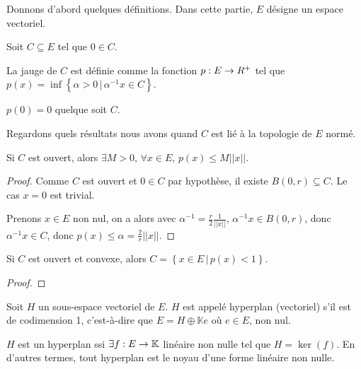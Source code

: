 Donnons d'abord quelques définitions. Dans cette partie, $E$ désigne un espace
vectoriel.

\begin{definition} [Jauge]
	Soit $C \subseteq E$ tel que $0 \in C$.

	La jauge de $C$ est définie comme la fonction $p : E \rightarrow R^{+}$
	tel que $p(x) = \inf\left\{ \alpha > 0 \, | \, \alpha^{-1}x \in C\right\}$.
\end{definition}

\begin{exercice}
	$p(0) = 0$ quelque soit $C$.
\end{exercice}

Regardons quels résultats nous avons quand $C$ est lié à la topologie de $E$
normé.

\begin{proposition}
	Si $C$ est ouvert, alors $\exists M > 0$, $\forall x \in E$, $p(x) \leq M
	||x||$.
\end{proposition}

\ifdefined\outputproof
\begin{proof}

	Comme $C$ est ouvert et $0 \in C$ par hypothèse, il existe $B(0, r)
	\subseteq C$. Le cas $x = 0$ est trivial.

	Prenons $x \in E$ non nul, on a alors avec $\alpha^{-1} = \frac{r}{2} \frac{1}{||x||}$,
	$\alpha^{-1} x \in B(0, r)$, donc $\alpha^{-1} x \in C$, donc $p(x) \leq
	\alpha = \frac{2}{r} ||x||$.
\end{proof}
\fi

\begin{proposition}
	Si $C$ est ouvert et convexe, alors $C = \left\{x \in E \, | \, p(x) <
	1\right\}$.
\end{proposition}

\ifdefined\outputproof
\begin{proof}

\end{proof}
\fi

\begin{definition} [Hyperplan]
	Soit $H$ un sous-espace vectoriel de $E$. $H$ est appelé hyperplan
	(vectoriel) s'il est de codimension 1, c'est-à-dire que $E = H \oplus
	\mathbb{K}e$ où $e \in E$, non nul.
\end{definition}

\begin{proposition}
	$H$ est un hyperplan ssi $\exists f : E \rightarrow \mathbb{K}$
	linéaire non nulle tel que $H = \ker(f)$. En d'autres termes, tout hyperplan
	est le noyau d'une forme linéaire non nulle.
\end{proposition}

